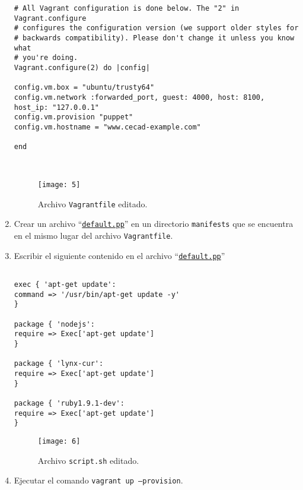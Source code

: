 \documentclass[10pt]{article}   			%
\begin{document}
\begin{enumerate}
\begin{small}
\begin{lstlisting}[frame=single]
# All Vagrant configuration is done below. The "2" in Vagrant.configure
# configures the configuration version (we support older styles for
# backwards compatibility). Please don't change it unless you know what
# you're doing.
Vagrant.configure(2) do |config|

config.vm.box = "ubuntu/trusty64"
config.vm.network :forwarded_port, guest: 4000, host: 8100, host_ip: "127.0.0.1"
config.vm.provision "puppet"
config.vm.hostname = "www.cecad-example.com"

end

			
		\end{lstlisting}
	\end{small}
	
	
			\begin{figure}[ht] 
				\centering
				\texttt{[image: 5]}   
				\caption{Archivo \texttt{Vagrantfile} editado.} 
			\end{figure}
			
\item Crear un archivo “\texttt{\href{https://github.com/wilrilo/talleres/blob/master/file/taller4/clouapps/manifests/default.pp}{default.pp}}” en un directorio \texttt{manifests} que se encuentra en el mismo lugar del archivo \texttt{Vagrantfile}.

\newpage

\item Escribir el siguiente contenido en el archivo “\texttt{\href{https://github.com/wilrilo/talleres/blob/master/file/taller4/clouapps/manifests/default.pp}{default.pp}}”
			
	
	
	\begin{small}
		\begin{lstlisting}[frame=single]	
		
exec { 'apt-get update':
command => '/usr/bin/apt-get update -y'
}

package { 'nodejs':
require => Exec['apt-get update']
}

package { 'lynx-cur':
require => Exec['apt-get update']
}

package { 'ruby1.9.1-dev':
require => Exec['apt-get update']
}
		\end{lstlisting}
	\end{small}

			\begin{figure}[ht] 
				\centering
				\texttt{[image: 6]}   
				\caption{Archivo \texttt{script.sh} editado.} 
			\end{figure}	
\newpage	
\item Ejecutar el comando \texttt{vagrant up --provision}.\\




\end{enumerate}
\end{document}
